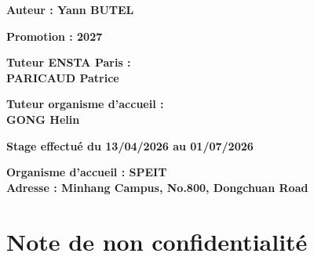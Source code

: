 \documentclass[12pt,a4paper,french]{report}
\newcommand{\monNom}{BUTEL}
\newcommand{\monPrenom}{Yann}
\newcommand{\maPromotion}{2027}
\newcommand{\organisme}{SPEIT}
\newcommand{\adresseOrganisme}{Minhang Campus, No.800, Dongchuan Road}
\newcommand{\tuteurENSTA}{PARICAUD Patrice}
\newcommand{\tuteurOrganisme}{GONG Helin}
\newcommand{\dateDebut}{13/04/2026}
\newcommand{\dateFin}{01/07/2026}
\begin{document}
\begin{titlepage}
\begin{center}
\vspace{1.0cm}

\noindent
\begin{minipage}[t]{0.48\textwidth}
  \raggedright\large\bfseries Auteur : \monPrenom{} \monNom
\end{minipage}
\hfill
\begin{minipage}[t]{0.48\textwidth}
  \raggedleft\large\bfseries Promotion : \maPromotion
\end{minipage}

\vspace{0.8cm}

\noindent
\begin{minipage}[t]{0.48\textwidth}
  \raggedright\bfseries Tuteur ENSTA Paris :\\ \tuteurENSTA
\end{minipage}
\hfill
\begin{minipage}[t]{0.48\textwidth}
  \raggedleft\bfseries Tuteur organisme d'accueil :\\ \tuteurOrganisme
\end{minipage}

\vspace{0.9cm}

{\bfseries Stage effectué du \dateDebut{} au \dateFin\par}

\vspace{0.5cm}

\noindent\begin{minipage}{\textwidth}\centering\bfseries
  Organisme d'accueil : \organisme\\
  Adresse : \adresseOrganisme
\end{minipage}

\end{center}
\end{titlepage}

\thispagestyle{empty}
\mbox{}
\clearpage

\thispagestyle{empty}
\chapter*{Note de non confidentialité}
\end{document}

